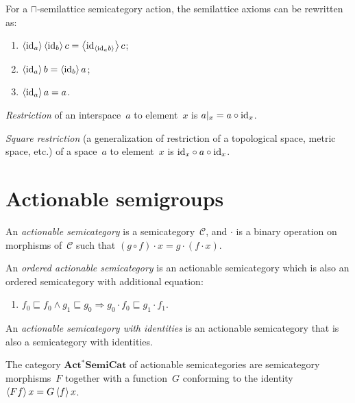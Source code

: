 \documentclass[a4paper,oneside,english,reqno]{amsart}
\begin{document}
\begin{prop}
For a $\sqcap$-se\-mi\-lat\-ti\-ce semicategory action, the semilattice axioms can be rewritten as:
\begin{enumerate}
\item $\left\langle {\operatorname{id}}_a\right\rangle\left\langle {\operatorname{id}}_b\right\rangle c = \left\langle {\operatorname{id}}_{\left\langle {\operatorname{id}}_a b\right\rangle}\right\rangle c$;
\item $\left\langle {\operatorname{id}}_a\right\rangle b = \left\langle {\operatorname{id}}_b\right\rangle a$;
\item $\left\langle {\operatorname{id}}_a\right\rangle a = a$.
\end{enumerate}
\end{prop}

\emph{Restriction} of an interspace~$a$ to element~$x$ is $a|_x=a\circ{\operatorname{id}}_x$.

\emph{Square restriction} (a generalization of restriction of a topological space, metric space, etc.) of a space~$a$ to element~$x$ is ${\operatorname{id}}_x\circ a\circ{\operatorname{id}}_x$.

\section{Actionable semigroups}

\begin{defn}
An \emph{actionable semicategory} is a semicategory~$\mathcal{C}$, and $\cdot$ is a binary operation on morphisms of~$\mathcal{C}$ such that $(g\circ f)\cdot x = g\cdot(f\cdot x)$.
\end{defn}

\begin{defn}
An \emph{ordered actionable semicategory} is an actionable semicategory which is also an ordered semicategory with additional equation:
\begin{enumerate}
\item $f_0\sqsubseteq f_0\land g_1\sqsubseteq g_0 \Rightarrow g_0\cdot f_0\sqsubseteq g_1\cdot f_1$.
\end{enumerate}
\end{defn}

\begin{defn}
An \emph{actionable semicategory with identities} is an actionable semicategory that is also a semicategory with identities.
\end{defn}

\begin{defn}
The category $\mathbf{Act^{\ast}SemiCat}$ of actionable semicategories are semicategory morphisms~$F$ together with a function~$G$ conforming to the identity $\left\langle Ff\right\rangle x=G\left\langle f\right\rangle x$.
\end{defn}
\end{document}
